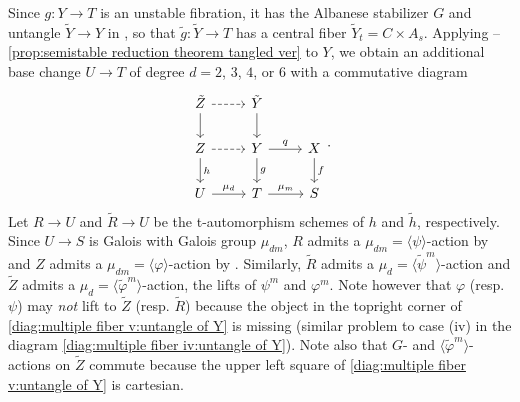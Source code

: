 \documentclass[reqno, letterpaper]{amsart}
\numberwithin{equation}{subsection}
\let\to\longrightarrow
\begin{document}
		Since $g : Y \to T$ is an unstable fibration, it has the Albanese stabilizer $G$ and untangle $\tilde Y \to Y$ in , so that $\tilde g : \tilde Y \to T$ has a central fiber $\tilde Y_t = C \times A_s$. Applying --\ref{prop:semistable reduction theorem tangled ver} to $Y$, we obtain an additional base change $U \to T$ of degree $d = 2$, $3$, $4$, or $6$ with a commutative diagram
		\begin{equation} \label{diag:multiple fiber v:untangle of Y}
		\begin{tikzcd}
			\tilde Z \arrow[r, dashed] \arrow[d] & \tilde Y \arrow[d] \\
			Z \arrow[r, dashed] \arrow[d, "h"] & Y \arrow[r, "q"] \arrow[d, "g"] & X \arrow[d, "f"] \\
			U \arrow[r, "\mu_d"] & T \arrow[r, "\mu_m"] & S
		\end{tikzcd}.
		\end{equation}
		Let $R \to U$ and $\tilde R \to U$ be the t-automorphism schemes of $h$ and $\tilde h$, respectively. Since $U \to S$ is Galois with Galois group $\mu_{dm}$, $R$ admits a $\mu_{dm} = \langle \psi \rangle$-action by  and $Z$ admits a $\mu_{dm} = \langle \varphi \rangle$-action by . Similarly, $\tilde R$ admits a $\mu_d = \langle \tilde \psi^m \rangle$-action and $\tilde Z$ admits a $\mu_d = \langle \tilde \varphi^m \rangle$-action, the lifts of $\psi^m$ and $\varphi^m$. Note however that $\varphi$ (resp. $\psi$) may \emph{not} lift to $\tilde Z$ (resp. $\tilde R$) because the object in the topright corner of \eqref{diag:multiple fiber v:untangle of Y} is missing (similar problem to case (iv) in the diagram \eqref{diag:multiple fiber iv:untangle of Y}). Note also that $G$- and $\langle \tilde \varphi^m \rangle$-actions on $\tilde Z$ commute because the upper left square of \eqref{diag:multiple fiber v:untangle of Y} is cartesian.
		
\end{document}
